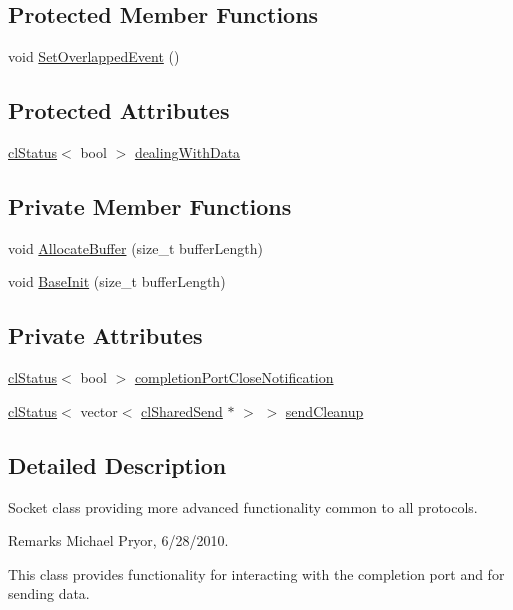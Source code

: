 \subsection*{Protected Member Functions}
\begin{DoxyCompactItemize}
\item 
void \hyperlink{classcl_socket_a8088a2405e76acca3b41175552bc0f6c}{SetOverlappedEvent} ()
\end{DoxyCompactItemize}
\subsection*{Protected Attributes}
\begin{DoxyCompactItemize}
\item 
\hyperlink{classcl_status}{clStatus}$<$ bool $>$ \hyperlink{classcl_socket_a119bea012ab04183f3a796a295438bd2}{dealingWithData}
\end{DoxyCompactItemize}
\subsection*{Private Member Functions}
\begin{DoxyCompactItemize}
\item 
void \hyperlink{classcl_socket_a00eb42e7e8c38331ef4ff6f16b3c9faa}{AllocateBuffer} (size\_\-t bufferLength)
\item 
void \hyperlink{classcl_socket_afe1d9f526b5ec117cec258fccd3dc50b}{BaseInit} (size\_\-t bufferLength)
\end{DoxyCompactItemize}
\subsection*{Private Attributes}
\begin{DoxyCompactItemize}
\item 
\hyperlink{classcl_status}{clStatus}$<$ bool $>$ \hyperlink{classcl_socket_ae17183becacd182ade36644e561c1aca}{completionPortCloseNotification}
\item 
\hyperlink{classcl_status}{clStatus}$<$ vector$<$ \hyperlink{classcl_shared_send}{clSharedSend} $\ast$ $>$ $>$ \hyperlink{classcl_socket_a9e241858d57abe94c6e600040882091e}{sendCleanup}
\end{DoxyCompactItemize}


\subsection{Detailed Description}
Socket class providing more advanced functionality common to all protocols. \begin{DoxyRemark}{Remarks}
Michael Pryor, 6/28/2010.
\end{DoxyRemark}
This class provides functionality for interacting with the completion port and for sending data.\par
\par


